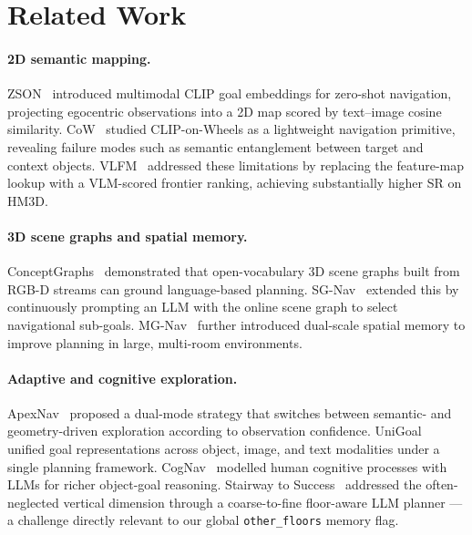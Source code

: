 \documentclass[10pt,twocolumn,letterpaper]{article}
\begin{document}
\section{Related Work}

\paragraph{2D semantic mapping.}
ZSON~\cite{majumdar2022zson} introduced multimodal CLIP goal embeddings for
zero-shot navigation, projecting egocentric observations into a 2D map scored
by text--image cosine similarity.
CoW~\cite{gadre2023cow} studied CLIP-on-Wheels as a lightweight navigation
primitive, revealing failure modes such as semantic entanglement between
target and context objects.
VLFM~\cite{yokoyama2024vlfm} addressed these limitations by replacing the
feature-map lookup with a VLM-scored frontier ranking, achieving substantially
higher SR on HM3D.

\paragraph{3D scene graphs and spatial memory.}
ConceptGraphs~\cite{gu2024conceptgraphs} demonstrated that open-vocabulary
3D scene graphs built from RGB-D streams can ground language-based planning.
SG-Nav~\cite{yin2024sgnav} extended this by continuously prompting an LLM
with the online scene graph to select navigational sub-goals.
MG-Nav~\cite{wang2025mgnav} further introduced dual-scale spatial memory to
improve planning in large, multi-room environments.

\paragraph{Adaptive and cognitive exploration.}
ApexNav~\cite{apexnav2024} proposed a dual-mode strategy that switches
between semantic- and geometry-driven exploration according to observation
confidence.
UniGoal~\cite{yin2025unigoal} unified goal representations across object,
image, and text modalities under a single planning framework.
CogNav~\cite{cao2025cognav} modelled human cognitive processes with LLMs for
richer object-goal reasoning.
Stairway to Success~\cite{stairway2024} addressed the often-neglected
vertical dimension through a coarse-to-fine floor-aware LLM planner ---
a challenge directly relevant to our global \texttt{other\_floors} memory
flag.
\end{document}

